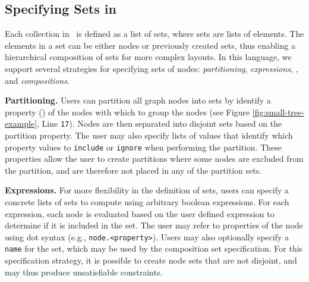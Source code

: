 
\subsection{Specifying Sets in \projectname}
Each collection in \projectname\ is defined as a list of sets, where sets
are lists of elements. The elements in a set can be either nodes or
previously created sets, thus enabling a hierarchical composition of sets
for more complex layouts. In this language, we support several strategies
for specifying sets of nodes: \emph{partitioning}, \emph{expressions},
, and \emph{compositions}.

\textbf{Partitioning.} Users can partition all graph nodes into sets by
identify a property () of the nodes
with which to group the nodes (see Figure \ref{fig:small-tree-example},
Line \texttt{17}). Nodes are then separated into disjoint sets based on the
partition property. The user may also specify lists of values that identify
which property values to \texttt{include} or \texttt{ignore} when
performing the partition. These properties allow the user to create
partitions where some nodes are excluded from the partition, and are
therefore not placed in any of the partition sets.

\textbf{Expressions.} For more flexibility in the definition of sets, users
can specify a concrete lists of sets to compute using arbitrary boolean
expressions. For each expression, each node is evaluated based on the user
defined expression to determine if it is included in the set. The user may
refer to properties of the node using dot syntax (e.g.,
\texttt{node.<property>}). Users may also optionally specify a
\texttt{name} for the set, which may be used by the composition set
specification. For this specification strategy, it is possible to create
node sets that are not disjoint, and may thus produce unsatisfiable
constraints. 

